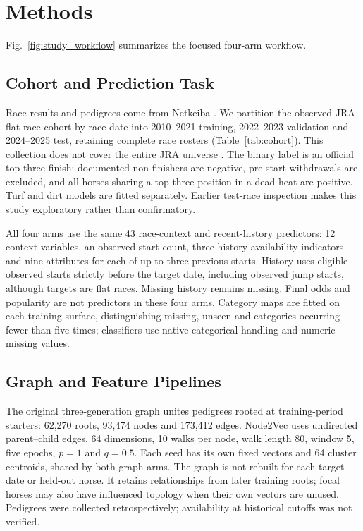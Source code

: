 \section{Methods}
Fig.~\ref{fig:study_workflow} summarizes the focused four-arm workflow.

\subsection{Cohort and Prediction Task}
Race results and pedigrees come from Netkeiba \cite{netkeibaRace,netkeibaDb}. We partition the observed JRA flat-race cohort by race date into 2010--2021 training, 2022--2023 validation and 2024--2025 test, retaining complete race rosters (Table~\ref{tab:cohort}). This collection does not cover the entire JRA universe \cite{jraStats2yo,jraStats3up}. The binary label is an official top-three finish: documented non-finishers are negative, pre-start withdrawals are excluded, and all horses sharing a top-three position in a dead heat are positive. Turf and dirt models are fitted separately. Earlier test-race inspection makes this study exploratory rather than confirmatory.



All four arms use the same 43 race-context and recent-history predictors: 12 context variables, an observed-start count, three history-availability indicators and nine attributes for each of up to three previous starts. History uses eligible observed starts strictly before the target date, including observed jump starts, although targets are flat races. Missing history remains missing. Final odds and popularity are not predictors in these four arms. Category maps are fitted on each training surface, distinguishing missing, unseen and categories occurring fewer than five times; classifiers use native categorical handling and numeric missing values.

\subsection{Graph and Feature Pipelines}
The original three-generation graph unites pedigrees rooted at training-period starters: 62,270 roots, 93,474 nodes and 173,412 edges. Node2Vec \cite{grover2016} uses undirected parent--child edges, 64 dimensions, 10 walks per node, walk length 80, window 5, five epochs, $p=1$ and $q=0.5$. Each seed has its own fixed vectors and 64 cluster centroids, shared by both graph arms. The graph is not rebuilt for each target date or held-out horse. It retains relationships from later training roots; focal horses may also have influenced topology when their own vectors are unused. Pedigrees were collected retrospectively; availability at historical cutoffs was not verified.

